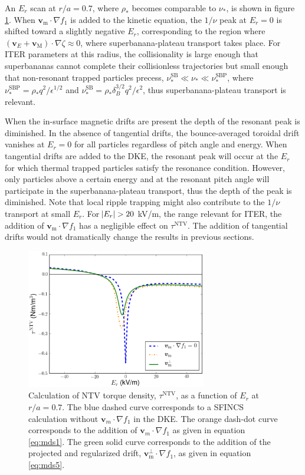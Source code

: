 \documentclass[aip, pop, preprint]{revtex4-1}
\begin{document}
An $E_r$ scan at $r/a = 0.7$, where $\rho_*$ becomes comparable to $\nu_*$, is shown in figure \ref{fig:driftschemes}. When $\bm{v}_{\mathrm{m}} \cdot \nabla f_1$ is added to the kinetic equation, the $1/\nu$ peak at $E_r = 0$ is shifted toward a slightly negative $E_r$, corresponding to the region where $(\bm{v}_E + \bm{v}_\mathrm{M})\cdot \nabla \zeta \approx 0$, where superbanana-plateau transport takes place. For ITER parameters at this radius, the collisionality is large enough that superbananas cannot complete their collisionless trajectories but small enough that non-resonant trapped particles precess, $\nu_*^{\mathrm{SB}} \ll \nu_* \ll \nu_*^{\mathrm{SBP}}$, where $\nu_*^{\mathrm{SBP}} = \rho_*q^2/\epsilon^{1/2}$ and $\nu_*^{\mathrm{SB}} = \rho_* \delta_B^{3/2} q^2/\epsilon^2$,\cite{Shaing2009_sb, Shaing2009_sbp} thus superbanana-plateau transport is relevant.

When the in-surface magnetic drifts are present the depth of the resonant peak is diminished. In the absence of tangential drifts, the bounce-averaged toroidal drift vanishes at $E_r = 0$ for all particles regardless of pitch angle and energy. When tangential drifts are added to the DKE, the resonant peak will occur at the $E_r$ for which thermal trapped particles satisfy the resonance condition. However, only particles above a certain energy and at the resonant pitch angle will participate in the superbanana-plateau transport, thus the depth of the peak is diminished. Note that local ripple trapping might also contribute to the $1/\nu$ transport at small $E_r$. For $\abs{E_r} > 20$ kV/m, the range relevant for ITER, the addition of $\bm{v}_{\mathrm{m}}\cdot \nabla f_1$ has a negligible effect on $\tau^{\mathrm{NTV}}$. The addition of tangential drifts would not dramatically change the results in previous sections.  

\begin{figure}[h!]
\centering
\includegraphics[width=0.7\textwidth]{figure13.eps}
\caption{\label{fig:driftschemes} Calculation of NTV torque density, $\tau^{\mathrm{NTV}}$, as a function of $E_r$ at $r/a = 0.7$. The blue dashed curve corresponds to a SFINCS calculation without $\bm{v}_m \cdot \nabla f_1$ in the DKE. The orange dash-dot curve corresponds to the addition of $\bm{v}_m \cdot \nabla f_1$ as given in equation \ref{eq:mds1}. The green solid curve corresponds to the addition of the projected and regularized drift, $\bm{v}^{\perp}_{\text{m}} \cdot \nabla f_1$, as given in equation \ref{eq:mds5}. }
\end{figure}
\end{document}
